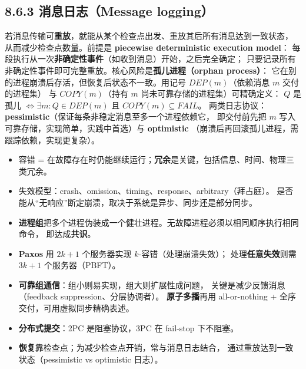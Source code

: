 \subsection*{8.6.3 消息日志（Message logging）}
若消息传输可\textbf{重放}，就能从某个检查点出发、重放其后所有消息达到一致状态，
从而减少检查点数量。前提是 \textbf{piecewise deterministic execution model}：
每段执行从一次\textbf{非确定性事件}（如收到消息）开始，之后完全确定；
只要记录所有非确定性事件即可完整重放。核心风险是\textbf{孤儿进程（orphan process）}：
它在别的进程崩溃后存活，但恢复后状态不一致。用记号 $DEP(m)$（依赖消息 $m$ 交付的进程集）
与 $COPY(m)$（持有 $m$ 尚未可靠存储的进程集）可精确定义：
$Q$ 是孤儿 $\iff \exists m: Q \in DEP(m)$ 且 $COPY(m) \subseteq FAIL$。
两类日志协议：\textbf{pessimistic}（保证每条非稳定消息至多一个进程依赖它，
即交付前先把 $m$ 写入可靠存储，实现简单，实践中首选）与 \textbf{optimistic}
（崩溃后再回滚孤儿进程，需跟踪依赖，实现更复杂）。

\begin{closeread}
\end{closeread}



\begin{itemize}
  \item 容错 = 在故障存在时仍能继续运行；\textbf{冗余}是关键，包括信息、时间、物理三类冗余。
  \item 失效模型：crash、omission、timing、response、arbitrary（拜占庭）。
        是否能从“无响应”断定崩溃，取决于系统是异步、同步还是部分同步。
  \item \textbf{进程组}把多个进程伪装成一个健壮进程。无故障进程必须以相同顺序执行相同命令，
        即达成\textbf{共识}。
  \item \textbf{Paxos} 用 $2k+1$ 个服务器实现 $k$-容错（处理崩溃失效）；
        处理\textbf{任意失效}则需 $3k+1$ 个服务器（PBFT）。
  \item \textbf{可靠组通信}：组小则易实现，组大则扩展性成问题，
        关键是减少反馈消息（feedback suppression、分层协调者）。
        \textbf{原子多播}再用 all-or-nothing + 全序交付，可用虚拟同步精确表述。
  \item \textbf{分布式提交}：2PC 是阻塞协议，3PC 在 fail-stop 下不阻塞。
  \item \textbf{恢复}靠检查点；为减少检查点开销，常与消息日志结合，
        通过重放达到一致状态（pessimistic vs optimistic 日志）。
\end{itemize}

